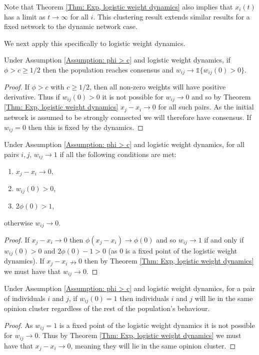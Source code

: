 \documentclass{article}
\begin{document}
Note that Theorem \ref{Thm: Exp, logistic weight dynamics} also implies that $x_i(t)$ has a limit as $t\rightarrow\infty$ for all $i$. This clustering result extends similar results for a fixed network to the dynamic network case. 

We next apply this specifically to logistic weight dynamics. 

\begin{corollary}
    Under Assumption \ref{Assumption: phi > c} and logistic weight dynamics, if $\phi>c\geq 1/2$ then the population reaches consensus and $w_{ij} \rightarrow \mathds{1}\{w_{ij}(0)>0\}$. 
\end{corollary}
\begin{proof}
    If $\phi > c$ with $c \geq 1/2$, then all non-zero weights will have positive derivative. Thus if $w_{ij}(0)>0$ it is not possible for $w_{ij}\rightarrow0$ and so by Theorem \ref{Thm: Exp, logistic weight dynamics} $x_j - x_i \rightarrow 0$ for all such pairs. As the initial network is assumed to be strongly connected we will therefore have consensus. If $w_{ij}=0$ then this is fixed by the dynamics. 
\end{proof}

\begin{corollary} \label{Corollary: limit of w_ij (exp,logistic)}
    Under Assumption \ref{Assumption: phi > c} and logistic weight dynamics, for all pairs $i,j$, $w_{ij}\rightarrow1$ if all the following conditions are met:
    \begin{enumerate}[label=\alph*)]
        \item $x_j - x_i \rightarrow 0$,
        \item $w_{ij}(0) > 0$,
        \item $2\phi(0)>1$,
    \end{enumerate}
    otherwise $w_{ij}\rightarrow0$. 
\end{corollary}
\begin{proof}
    If $x_j - x_i \rightarrow 0$ then $\phi(x_j - x_i) \rightarrow \phi(0)$ and so $w_{ij}\rightarrow 1$ if and only if $w_{ij}(0) > 0$ and $2\phi(0)-1>0$ (as $0$ is a fixed point of the logistic weight dynamics). If $x_j - x_i \nrightarrow 0$ then by Theorem \ref{Thm: Exp, logistic weight dynamics} we must have that $w_{ij}\rightarrow0$. 
\end{proof}

\begin{corollary}
    Under Assumption \ref{Assumption: phi > c} and logistic weight dynamics, for a pair of individuals $i$ and $j$, if $w_{ij}(0)=1$ then individuals $i$ and $j$ will lie in the same opinion cluster regardless of the rest of the population's behaviour.
\end{corollary}
\begin{proof}
    As $w_{ij}=1$ is a fixed point of the logistic weight dynamics it is not possible for $w_{ij}\rightarrow 0$. Thus by Theorem \ref{Thm: Exp, logistic weight dynamics} we must have that $x_j - x_i \rightarrow 0$, meaning they will lie in the same opinion cluster. 
\end{proof}
\end{document}
